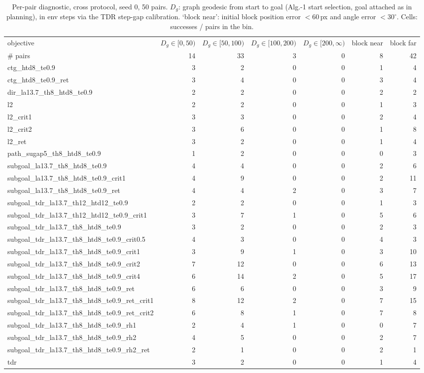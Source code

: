 \begin{table}[h]
\centering\small
\caption{Per-pair diagnostic, cross protocol, seed 0, 50 pairs. $D_g$: graph geodesic from start to goal (Alg.-1 start selection, goal attached as in planning), in env steps via the TDR step-gap calibration. `block near': initial block position error $<60$\,px and angle error $<30^\circ$. Cells: successes / pairs in the bin.}
\label{tab:pair-diag-cross-s0}
\begin{tabular}{lrrrrrr}
\toprule
objective & $D_g\in[0,50)$ & $D_g\in[50,100)$ & $D_g\in[100,200)$ & $D_g\in[200,\infty)$ & block near & block far \\
\# pairs & 14 & 33 & 3 & 0 & 8 & 42 \\
\midrule
ctg\_htd8\_te0.9 & 3 & 2 & 0 & 0 & 1 & 4 \\
ctg\_htd8\_te0.9\_ret & 3 & 4 & 0 & 0 & 3 & 4 \\
dir\_la13.7\_th8\_htd8\_te0.9 & 2 & 2 & 0 & 0 & 2 & 2 \\
l2 & 2 & 2 & 0 & 0 & 1 & 3 \\
l2\_crit1 & 3 & 3 & 0 & 0 & 2 & 4 \\
l2\_crit2 & 3 & 6 & 0 & 0 & 1 & 8 \\
l2\_ret & 3 & 2 & 0 & 0 & 1 & 4 \\
path\_sugap5\_th8\_htd8\_te0.9 & 1 & 2 & 0 & 0 & 0 & 3 \\
subgoal\_la13.7\_th8\_htd8\_te0.9 & 4 & 4 & 0 & 0 & 2 & 6 \\
subgoal\_la13.7\_th8\_htd8\_te0.9\_crit1 & 4 & 9 & 0 & 0 & 2 & 11 \\
subgoal\_la13.7\_th8\_htd8\_te0.9\_ret & 4 & 4 & 2 & 0 & 3 & 7 \\
subgoal\_tdr\_la13.7\_th12\_htd12\_te0.9 & 2 & 2 & 0 & 0 & 1 & 3 \\
subgoal\_tdr\_la13.7\_th12\_htd12\_te0.9\_crit1 & 3 & 7 & 1 & 0 & 5 & 6 \\
subgoal\_tdr\_la13.7\_th8\_htd8\_te0.9 & 3 & 2 & 0 & 0 & 2 & 3 \\
subgoal\_tdr\_la13.7\_th8\_htd8\_te0.9\_crit0.5 & 4 & 3 & 0 & 0 & 4 & 3 \\
subgoal\_tdr\_la13.7\_th8\_htd8\_te0.9\_crit1 & 3 & 9 & 1 & 0 & 3 & 10 \\
subgoal\_tdr\_la13.7\_th8\_htd8\_te0.9\_crit2 & 7 & 12 & 0 & 0 & 6 & 13 \\
subgoal\_tdr\_la13.7\_th8\_htd8\_te0.9\_crit4 & 6 & 14 & 2 & 0 & 5 & 17 \\
subgoal\_tdr\_la13.7\_th8\_htd8\_te0.9\_ret & 6 & 6 & 0 & 0 & 3 & 9 \\
subgoal\_tdr\_la13.7\_th8\_htd8\_te0.9\_ret\_crit1 & 8 & 12 & 2 & 0 & 7 & 15 \\
subgoal\_tdr\_la13.7\_th8\_htd8\_te0.9\_ret\_crit2 & 6 & 8 & 1 & 0 & 7 & 8 \\
subgoal\_tdr\_la13.7\_th8\_htd8\_te0.9\_rh1 & 2 & 4 & 1 & 0 & 0 & 7 \\
subgoal\_tdr\_la13.7\_th8\_htd8\_te0.9\_rh2 & 4 & 5 & 0 & 0 & 2 & 7 \\
subgoal\_tdr\_la13.7\_th8\_htd8\_te0.9\_rh2\_ret & 2 & 1 & 0 & 0 & 2 & 1 \\
tdr & 3 & 2 & 0 & 0 & 1 & 4 \\
\bottomrule
\end{tabular}
\end{table}
